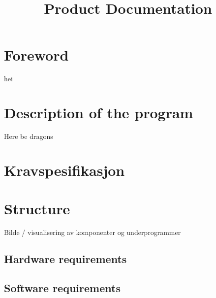 \documentclass[10pt]{report}
\title{Product Documentation}
\begin{document}
\section*{Foreword}
hei
\section*{Description of the program}
Here be dragons

\section*{Kravspesifikasjon}
\section*{Structure}
	Bilde / visualisering av komponenter og underprogrammer 
	\subsection*{Hardware requirements}
	\subsection*{Software requirements}
\end{document}
